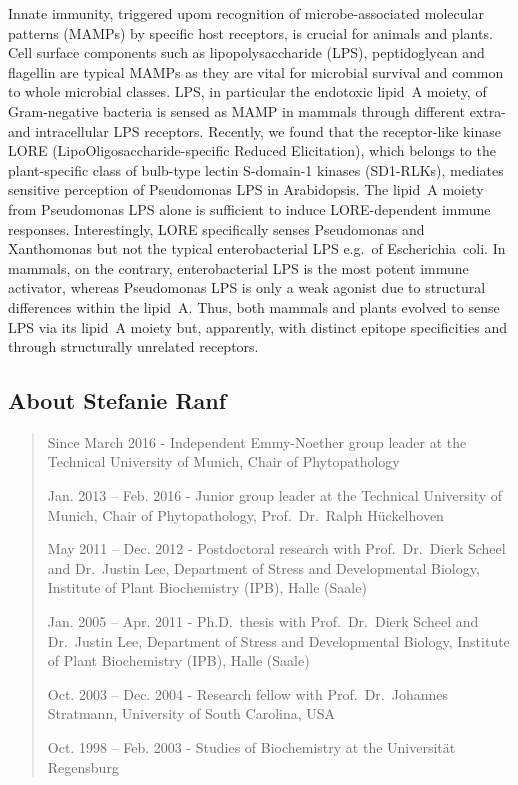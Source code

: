 \documentclass[12pt,]{book}
\theoremstyle{definition}
\theoremstyle{definition}
\theoremstyle{remark}
\begin{document}
Innate immunity, triggered upom recognition of microbe-associated
molecular patterns (MAMPs) by specific host receptors, is crucial for
animals and plants. Cell surface components such as lipopolysaccharide
(LPS), peptidoglycan and flagellin are typical MAMPs as they are vital
for microbial survival and common to whole microbial classes. LPS, in
particular the endotoxic lipid~A moiety, of Gram-negative bacteria is
sensed as MAMP in mammals through different extra- and intracellular LPS
receptors. Recently, we found that the receptor-like kinase LORE
(LipoOligosaccharide-specific Reduced Elicitation), which belongs to the
plant-specific class of bulb-type lectin S-domain-1 kinases (SD1-RLKs),
mediates sensitive perception of Pseudomonas LPS in Arabidopsis. The
lipid~A moiety from Pseudomonas LPS alone is sufficient to induce
LORE-dependent immune responses. Interestingly, LORE specifically senses
Pseudomonas and Xanthomonas but not the typical enterobacterial LPS
e.g.~of Escherichia~coli. In mammals, on the contrary, enterobacterial
LPS is the most potent immune activator, whereas Pseudomonas LPS is only
a weak agonist due to structural differences within the lipid~A. Thus,
both mammals and plants evolved to sense LPS via its lipid~A moiety but,
apparently, with distinct epitope specificities and through structurally
unrelated receptors.

\subsection*{About Stefanie Ranf}\label{about-stefanie-ranf}

\begin{quote}
Since March 2016 - Independent Emmy-Noether group leader at the
Technical University of Munich, Chair of Phytopathology

Jan. 2013 -- Feb. 2016 - Junior group leader at the Technical University
of Munich, Chair of Phytopathology, Prof.~Dr.~Ralph Hückelhoven

May 2011 -- Dec. 2012 - Postdoctoral research with Prof.~Dr.~Dierk
Scheel and Dr.~Justin Lee, Department of Stress and Developmental
Biology, Institute of Plant Biochemistry (IPB), Halle (Saale)

Jan. 2005 -- Apr. 2011 - Ph.D.~thesis with Prof.~Dr.~Dierk Scheel and
Dr.~Justin Lee, Department of Stress and Developmental Biology,
Institute of Plant Biochemistry (IPB), Halle (Saale)

Oct. 2003 -- Dec. 2004 - Research fellow with Prof.~Dr.~Johannes
Stratmann, University of South Carolina, USA

Oct. 1998 -- Feb. 2003 - Studies of Biochemistry at the Universität
Regensburg
\end{quote}
\end{document}
